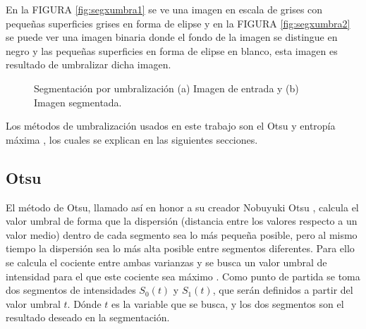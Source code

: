 En la FIGURA \ref{fig:segxumbra1} se ve una imagen en escala de grises con pequeñas superficies grises en forma de elipse y en la FIGURA \ref{fig:segxumbra2} se puede ver una imagen binaria donde el fondo de la imagen se distingue en negro y las pequeñas superficies en forma de elipse en blanco, esta imagen es resultado de umbralizar dicha imagen.

\begin{figure}[H]
	\centering
	\caption{Segmentación por umbralización (a) Imagen de entrada y (b) Imagen segmentada.}
	\label{fig:segxumbra}
\end{figure}


   
Los métodos de umbralización usados en este trabajo son el Otsu \cite{otsu1975threshold} y entropía máxima \cite{cattaneo2011metodos}, los cuales se explican en las siguientes secciones.
\subsection{Otsu}
El método de Otsu, llamado así en honor a su creador Nobuyuki Otsu \cite{otsu1975threshold}, calcula el valor umbral de forma que la dispersión (distancia entre los valores respecto a un valor medio) dentro de cada segmento sea lo más pequeña posible, pero al mismo tiempo la dispersión sea lo más alta posible entre segmentos diferentes. Para ello se calcula el cociente entre ambas varianzas y se busca un valor umbral de intensidad para el que este cociente sea máximo \cite{gonzalez2013tecnicas}. 
Como punto de partida se toma dos segmentos de intensidades $S_0(t)$  y $S_1(t)$, que serán definidos a partir del valor umbral $t$. Dónde $t$ es la variable que se busca, y los dos segmentos son el resultado deseado en la segmentación. 

